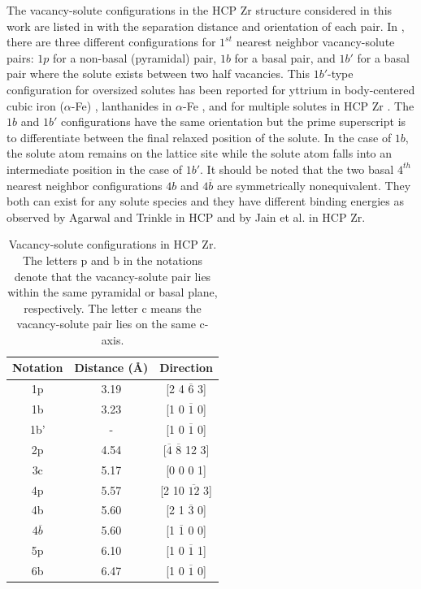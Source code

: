 \documentclass[preprint,12pt]{elsarticle}
\providecommand{\DIFadd}[1]{{\bf #1}} %
\providecommand{\DIFdel}[1]{} %
\providecommand{\DIFaddbegin}{\protect\color{blue}} %
\providecommand{\DIFaddend}{\protect\color{black}} %
\providecommand{\DIFdelbegin}{\protect\color{red}} %
\providecommand{\DIFdelend}{\protect\color{black}} %
\newcommand{\DIFscaledelfig}{0.5}
\newlength{\DIFdelgraphicswidth} %
\newlength{\DIFdelgraphicsheight} %
\newcommand{\DIFaddincludegraphics}[2][]{{\color{blue}\fbox{\DIFOincludegraphics[#1]{#2}}}} %
\newcommand{\DIFdelincludegraphics}[2][]{%
\sbox{\DIFdelgraphicsbox}{\DIFOincludegraphics[#1]{#2}}%
\settoboxwidth{\DIFdelgraphicswidth}{\DIFdelgraphicsbox} %
\settoboxtotalheight{\DIFdelgraphicsheight}{\DIFdelgraphicsbox} %
\scalebox{\DIFscaledelfig}{%
\parbox[b]{\DIFdelgraphicswidth}{\usebox{\DIFdelgraphicsbox}\\[-\baselineskip] \rule{\DIFdelgraphicswidth}{0em}}\llap{\resizebox{\DIFdelgraphicswidth}{\DIFdelgraphicsheight}{%
\setlength{\unitlength}{\DIFdelgraphicswidth}%
\begin{picture}(1,1)%
\thicklines\linethickness{2pt} %
{\color[rgb]{1,0,0}\put(0,0){\framebox(1,1){}}}%
{\color[rgb]{1,0,0}\put(0,0){\line( 1,1){1}}}%
{\color[rgb]{1,0,0}\put(0,1){\line(1,-1){1}}}%
\end{picture}%
}\hspace*{3pt}}} %
} %
\DeclareRobustCommand{\DIFaddbegin}{\DIFOaddbegin \let\includegraphics\DIFaddincludegraphics} %
\DeclareRobustCommand{\DIFaddend}{\DIFOaddend \let\includegraphics\DIFOincludegraphics} %
\DeclareRobustCommand{\DIFdelbegin}{\DIFOdelbegin \let\includegraphics\DIFdelincludegraphics} %
\DeclareRobustCommand{\DIFdelend}{\DIFOaddend \let\includegraphics\DIFOincludegraphics} %
\begin{document}
The vacancy-solute configurations in the HCP Zr structure considered in this work are listed in  with the separation distance and orientation of each pair. In , there are three different configurations for $1^{st}$ nearest neighbor vacancy-solute pairs: $1p$ for a non-basal (pyramidal) pair, $1b$ for a basal pair, and $1b'$ for a basal pair where the solute exists between two half vacancies. This $1b'$-type configuration for oversized solutes has been reported for yttrium in body-centered cubic iron ($\alpha$-Fe) \cite{bocquet_migration_2017}, lanthanides in $\alpha$-Fe \cite{yang_significant_2023}, and for multiple solutes in HCP Zr \cite{jain_first-principles_2019}. The $1b$ and $1b'$ configurations have the same orientation but the prime superscript is to differentiate between the final relaxed position of the solute. In the case of $1b$, the solute atom remains on the lattice site while the solute atom falls into an intermediate position in the case of $1b'$. It should be noted that the two basal $4^{th}$ nearest neighbor configurations $4b$ and $4\overline{b}$ are symmetrically nonequivalent. They both can exist for any solute species and they have different binding energies as observed by Agarwal and Trinkle \cite{agarwal_exact_2017} in HCP \DIFdelbegin \DIFdel{magnesium }\DIFdelend \DIFaddbegin \DIFadd{Mg }\DIFaddend and by Jain et al. \cite{jain_first-principles_2019} in HCP Zr.

\begin{table}[h!]
    \centering
    \caption{Vacancy-solute configurations in HCP Zr. The letters p and b in the notations denote that the vacancy-solute pair lies within the same pyramidal or basal plane, respectively. The letter c means the vacancy-solute pair lies on the same c-axis.}
    \label{tab:vac-solute_distance}
    \begin{tabular}{c|c|c}
        \toprule
         Notation& Distance ({\AA})& Direction  \\
         \hline
         1p&3.19 & [2 4 $\overline{6}$ 3] \\
         1b&3.23 &[1 0 $\overline{1}$ 0] \\
         1b'& - & [1 0 $\overline{1}$ 0] \\
         2p&4.54 &[$\overline{4}$ $\overline{8}$ 12  3] \\
         3c&5.17 &[0 0 0 1] \\
         4p &5.57 &[2 10 $\overline{12}$ 3] \\
         4b&5.60 &[2 1 $\overline{3}$ 0] \\
         4$\overline{b}$&5.60 &[1 $\overline{1}$ 0 0] \\
         5p &6.10 & [1 0 $\overline{1}$ 1]\\
         6b &6.47 &[1 0 $\overline{1}$ 0] \\
         \bottomrule
    \end{tabular}
\end{table}
\end{document}
